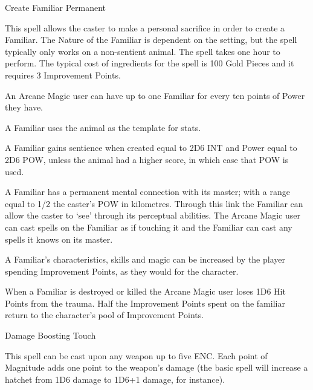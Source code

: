 \begin{rpg-spell}
{Create Familiar}
{Permanent}

This spell allows the caster to make a personal sacrifice in order to create a Familiar. The Nature of the Familiar is dependent on the setting, but the spell typically only works on a non-sentient animal. The spell takes one hour to perform. The typical cost of ingredients for the spell is 100 Gold Pieces and it requires 3 Improvement Points. 

\begin{rpg-list}
\item An Arcane Magic user can have up to one Familiar for every ten points of Power they have.
\item A Familiar uses the animal as the template for stats.
\item A Familiar gains sentience when created equal to 2D6 INT and Power equal to 2D6 POW, unless the animal had a higher score, in which case that POW is used. 
\item A Familiar has a permanent mental connection with its master; with a range equal to 1/2 the caster’s POW in kilometres. Through this link the Familiar can allow the caster to ‘see’ through its perceptual abilities. The Arcane Magic user can cast spells on the Familiar as if touching it and the Familiar can cast any spells it knows on its master.
\item A Familiar's characteristics, skills and magic can be increased by the player spending Improvement Points, as they would for the character.
\item When a Familiar is destroyed or killed the Arcane Magic user loses 1D6 Hit Points from the trauma. Half the Improvement Points spent on the familiar return to the character's pool of Improvement Points.
\end{rpg-list}

\end{rpg-spell}


\begin{rpg-spell}
{Damage Boosting}
{Touch}

This spell can be cast upon any weapon up to five ENC. Each point of Magnitude adds one point to the weapon’s damage (the basic spell will increase a hatchet from 1D6 damage to 1D6+1 damage, for instance). 
\end{rpg-spell}


